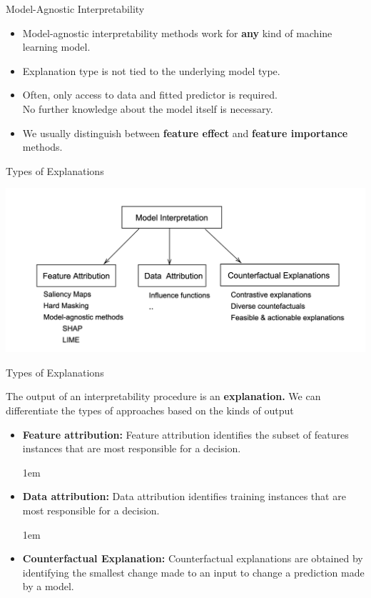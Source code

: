 \documentclass[11pt,compress,t,notes=noshow, xcolor=table]{beamer}
\begin{document}
\begin{vbframe}{Model-Agnostic Interpretability}
	\begin{itemize}
		\itemsep2em
		\item Model-agnostic interpretability methods work for \textbf{any} kind of machine learning model.
		\item Explanation type is not tied to the underlying model type.
		\item Often, only access to data and fitted predictor is required.\\
		 No further knowledge about the model itself is necessary.
		\item We usually distinguish between \textbf{feature effect} and \textbf{feature importance} methods.
	\end{itemize}
\end{vbframe}


\begin{vbframe}{Types of Explanations}
	\begin{center}
		\includegraphics[width=\textwidth]{figure/1-attributions.png}
    \end{center}
\end{vbframe}



\begin{vbframe}{Types of Explanations}

	The output of an interpretability procedure is an \textbf{explanation.} We can differentiate the types of approaches based on the kinds of output

	
	\begin{itemize}

    \itemsep1em
	\item 
		\textbf{Feature attribution:} Feature attribution identifies the subset of features instances that are most responsible for a decision.
	
	\itemsep1em
	
	
	\item 
		\textbf{Data attribution:} Data attribution identifies  training instances that are most responsible for a decision.
		
		\itemsep1em
		
	
	\item 
	   \textbf{Counterfactual Explanation:} 
	   Counterfactual explanations are  obtained by identifying the smallest change made to an input to change a prediction made by a model.
	  
	\end{itemize}
	
\end{vbframe}
\end{document}
